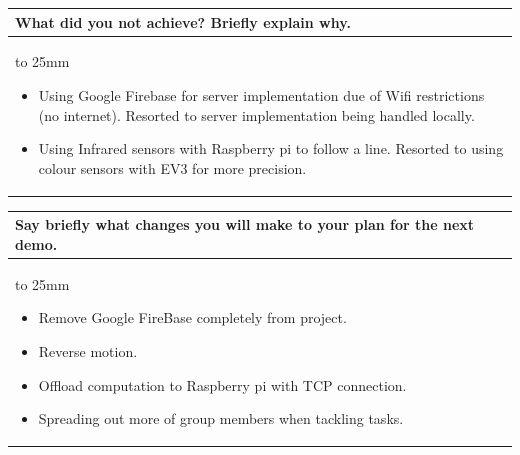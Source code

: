 \documentclass[a4paper]{article}
\newcommand{\colWidth}{141mm}
\begin{document}
\begin{center}

\begin{tabular}{|p{\colWidth}|}
	\hline
	\cellcolor{blue!25}\large
	\textbf{What did you not achieve? Briefly explain why.}
	\\ \hline
	\vtop to 25mm{
	\begin{itemize}
	    \item Using Google Firebase for server implementation due of Wifi restrictions (no internet). Resorted to server implementation being handled locally. 
	    \item Using Infrared sensors with Raspberry pi to follow a line. Resorted to using colour sensors with EV3 for more precision.
	\end{itemize}
  }
  \\
  \hline
\end{tabular}
\vskip 5mm


\begin{tabular}{|p{\colWidth}|}
	\hline
	\cellcolor{blue!25}\large
	\textbf{Say briefly what changes you will make to your plan for the next demo.}
	\\ \hline
	\vtop to 25mm{
	\begin{itemize}
	    \item Remove Google FireBase completely from project.
	    \item Reverse motion.
	    \item Offload computation to Raspberry pi with TCP connection.
	    \item Spreading out more of group members when tackling tasks.
	\end{itemize}
  }
  \\
  \hline
\end{tabular}


\end{center}
\end{document}
